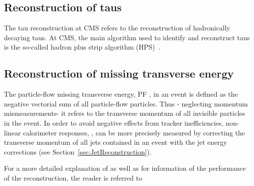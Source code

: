 \subsection{Reconstruction of taus}
The tau reconstruction at CMS refers to the reconstruction of hadronically decaying taus.
At CMS, the main algorithm used to identify and reconstruct taus is the so-called hadron plus strip algorithm (HPS)~\cite{bib:CMS:TauReconstruction}.


\subsection{Reconstruction of missing transverse energy}
The particle-flow missing transverse energy, PF \met, in an event is defined as the negative vectorial sum of all particle-flow particles.
Thus - neglecting momentum mismeasurements- it refers to the transverse momentum of all invisible particles in the event.
In order to avoid negative effects from \eg tracker inefficiencies, non-linear calorimeter responses, \etc, \met can be more precisely measured by correcting the transverse momentum of all jets contained in an event with the jet energy corrections (see Section~\ref{sec:JetReconstruction}).

For a more detailed explanation of \met as well as for information of the performance of the reconstruction, the reader is referred to~\cite{bib:CMS:METReconstruction}

